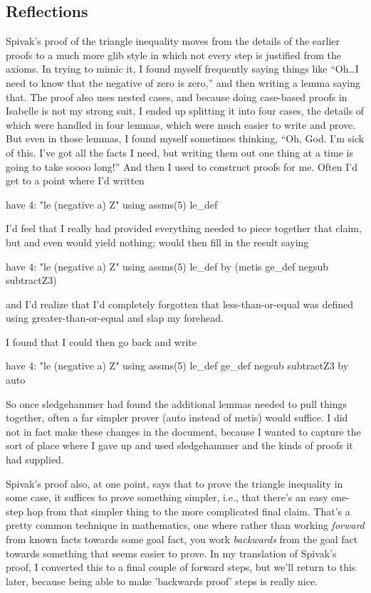 \subsection{Reflections}
Spivak's proof of the triangle inequality moves from the details of the earlier proofs to a much more glib style in which not every step is justified from the axioms. In trying to mimic it, I found myself frequently saying things like ``Oh…I need to know that the negative of zero is zero,'' and then writing a lemma saying that. The proof also uses nested cases, and because doing case-based proofs in Isabelle is not my strong suit, I ended up splitting it into four cases, the details of which were handled in four lemmas, which were much easier to write and prove. But even in those lemmas, I found myself sometimes thinking, ``Oh, God. I'm sick of this. I've got all the facts I need, but writing them out one thing at a time is going to take soooo long!'' And then I used  to construct proofs for me. Often I'd get to a point where I'd written
\begin{IS}
   have 4: "le (negative a) Z" using assms(5) le_def 
\end{IS}
I'd feel that I really had provided everything needed to piece together that claim, but  and even  would yield nothing;  would then fill in the result saying

\begin{IS}
   have 4: "le (negative a) Z" using assms(5) le_def 
   by (metis ge_def negsub subtractZ3)
\end{IS}
and I'd realize that I'd completely forgotten that less-than-or-equal was defined using greater-than-or-equal and slap my forehead. 

I found that I could then go back and write
\begin{IS}
   have 4: "le (negative a) Z" using assms(5) le_def ge_def negsub subtractZ3 by auto 
\end{IS}

So once sledgehammer had found the additional lemmas needed to pull things together, often a far simpler prover (auto instead of metis) would suffice. I did not in fact make these changes in the document, because I wanted to capture the sort of place where I gave up and used sledgehammer and the kinds of proofs it had supplied. 

Spivak's proof also, at one point, says that to prove the triangle inequality in some case, it suffices to prove something simpler, i.e., that there's an easy one-step hop from that simpler thing to the more complicated final claim. That's a pretty common technique in mathematics, one where rather than working \textit{forward} from known facts towards some goal fact, you work \textit{backwards} from the goal fact towards something that seems easier to prove. In my translation of Spivak's proof, I converted this to a final couple of forward steps, but we'll return to this later, because being able to make 'backwards proof' steps is really nice. 

